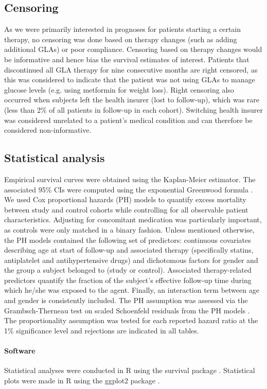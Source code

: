 \subsection{Censoring}
As we were primarily interested in prognoses for patients starting a certain therapy, no censoring was done based on therapy changes (such as adding additional GLAs) or poor compliance. Censoring based on therapy changes would be informative and hence bias the survival estimates of interest. Patients that discontinued all GLA therapy for nine consecutive months are right censored, as this was considered to indicate that the patient was not using GLAs to manage glucose levels (e.g. using metformin for weight loss). Right censoring also occurred when subjects left the health insurer (lost to follow-up), which was rare (less than 2\% of all patients in follow-up in each cohort). Switching health insurer was considered unrelated to a patient's medical condition and can therefore be considered non-informative.

\subsection{Statistical analysis}
Empirical survival curves were obtained using the Kaplan-Meier estimator. The associated 95\% CIs were computed using the exponential Greenwood formula \citep{s13}. 
We used Cox proportional hazards (PH) models to quantify excess mortality between study and control cohorts while controlling for all observable patient characteristics. Adjusting for concomitant medication was particularly important, as controls were only matched in a binary fashion. Unless mentioned otherwise, the PH models contained the following set of predictors: continuous covariates describing age at start of follow-up and associated therapy (specifically statins, antiplatelet and antihypertensive drugs) and dichotomous factors for gender and the group a subject belonged to (study or control). Associated therapy-related predictors quantify the fraction of the subject's effective follow-up time during which he/she was exposed to the agent. Finally, an interaction term between age and gender is consistently included. 
The PH assumption was assessed via the Grambsch-Therneau test on scaled Schoenfeld residuals from the PH models \citep{s14}. The proportionality assumption was tested for each reported hazard ratio at the 1\% significance level and rejections are indicated in all tables. 

\paragraph{Software}
Statistical analyses were conducted in R using the survival package \citep{s15,s16}. Statistical plots were made in R using the ggplot2 package \citep{s17}.

